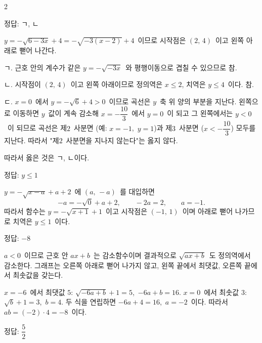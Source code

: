 \documentclass[10pt,fleqn]{article}
\begin{document}
\dmsoltitlefirsttrue
\begin{multicols*}{2}

\begin{dmanswerbox}
정답: ㄱ, ㄴ
\end{dmanswerbox}

$y=-\sqrt{6-3x}+4=-\sqrt{-3(x-2)}+4$\ 이므로 시작점은 $(2,\, 4)$\ 이고 왼쪽 아래로 뻗어 나간다.

\vspace{3mm}
ㄱ. 근호 안의 계수가 같은 $y=-\sqrt{-3x}$\ 와 평행이동으로 겹칠 수 있으므로 참.

\vspace{3mm}
ㄴ. 시작점이 $(2,\, 4)$\ 이고 왼쪽 아래이므로 정의역은 $x \le 2$, 치역은 $y \le 4$\ 이다. 참.

\vspace{3mm}
ㄷ. $x=0$\ 에서 $y=-\sqrt{6}+4>0$\ 이므로 곡선은 $y$\ 축 위 양의 부분을 지난다. 왼쪽으로 이동하면 $y$\ 값이 계속 감소해 $x=-\dfrac{10}{3}$\ 에서 $y=0$\ 이 되고 그 왼쪽에서는 $y<0$\ 이 되므로 곡선은 제$2$\ 사분면 (예: $x=-1$,\ $y=1$)과 제$3$\ 사분면 ($x<-\dfrac{10}{3}$) 모두를 지난다. 따라서 "제$2$\ 사분면을 지나지 않는다"는 옳지 않다.

\vspace{3mm}
따라서 옳은 것은 ㄱ, ㄴ이다.

\begin{dmanswerbox}
정답: $y \le 1$
\end{dmanswerbox}

$y=-\sqrt{x-a}+a+2$\ 에 $(a,\, -a)$\ 를 대입하면
\[ -a=-\sqrt{0}+a+2,\qquad -2a=2,\qquad a=-1. \]
따라서 함수는 $y=-\sqrt{x+1}+1$\ 이고 시작점은 $(-1,\, 1)$\ 이며 아래로 뻗어 나가므로 치역은 $y \le 1$\ 이다.

\begin{dmanswerbox}
정답: $-8$
\end{dmanswerbox}

$a<0$\ 이므로 근호 안 $ax+b$\ 는 감소함수이며 결과적으로 $\sqrt{ax+b}$\ 도 정의역에서 감소한다. 그래프는 오른쪽 아래로 뻗어 나가지 않고, 왼쪽 끝에서 최댓값, 오른쪽 끝에서 최솟값을 갖는다.

$x=-6$\ 에서 최댓값 $5$: $\sqrt{-6a+b}+1=5$,\ $-6a+b=16$.
$x=0$\ 에서 최솟값 $3$: $\sqrt{b}+1=3$,\ $b=4$.
두 식을 연립하면 $-6a+4=16$,\ $a=-2$\ 이다. 따라서 $ab=(-2)\cdot 4=-8$\ 이다.
\begin{dmanswerbox}
정답: $\dfrac{5}{2}$
\end{dmanswerbox}


\end{multicols*}
\end{document}
